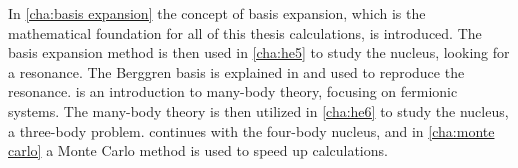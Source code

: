 In \cref{cha:basis expansion} the concept of 
basis expansion, which is the mathematical foundation for all of this thesis calculations, is introduced.
The basis expansion method is then used in 
\cref{cha:he5} to study the  nucleus, looking for a resonance.
The Berggren basis is explained in and used to reproduce the resonance.
 is an introduction to many-body theory, focusing 
on fermionic systems. The many-body theory is then utilized in \cref{cha:he6} 
to study the  nucleus, a three-body problem. 
continues with the four-body  nucleus, and in \cref{cha:monte carlo}
a Monte Carlo method is used to speed up calculations.
